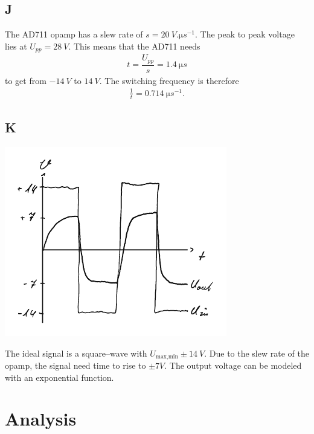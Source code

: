 \documentclass[a4paper,10pt]{article}
\newenvironment{Figure}
        {\par\medskip\noindent\minipage{\linewidth}}
        {\endminipage\par\medskip}
\numberwithin{equation}{section}
\begin{document}
\begin{multicols}{2}
	\subsection{J}
	The AD711 opamp has a slew rate of $s=\SI{20}{V.\micro s ^{-1}}$.
	The peak to peak voltage lies at $U_{p p}=\SI{28}{V}$.
	This means that the AD711 needs
	\begin{align}
		t=\dfrac{U_{p p}}{s}=\SI{1.4}{\micro s}
	\end{align}
	to get from $\SI{-14}{V}$ to $\SI{+14}{V}$.
	The switching frequency is therefore
	\begin{align}
		\tfrac{1}{t}=\SI{0.714}{\micro s ^{-1}}
        .\end{align}

	\subsection{K} \label{pre:K}
	\begin{Figure}
		\centering
		\includegraphics[width=\textwidth]{../plot/preK_crop.pdf}
	\end{Figure}
	\noindent The ideal signal is a square--wave with $U_\text{max,min}\pm \SI{14}{V}$.
	Due to the slew rate of the opamp, the signal need time to rise to $\pm \si{7}{V}$.
	The output voltage can be modeled with an exponential function.

	\newpage
	\section{Analysis}

\end{multicols}
\end{document}
